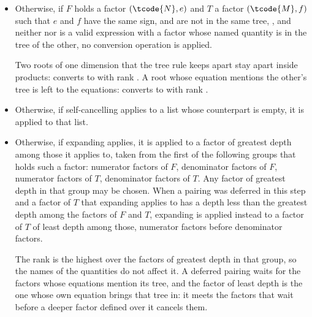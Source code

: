 \begin{itemize}
for which  is a valid expression with a factor
whose named quantity, recursively, has such an equation.
\begin{note}
The sideways relation between two siblings is decided once every factor of their tree is present.
The named quantity of a factor that defers a pairing has an equation and therefore a defining ancestor,
so expanding applies to that factor;
a deferred pairing is applied once it is no longer deferred.
\end{note}
\item
Otherwise, if $F$ holds a factor $(\tcode{N}, e)$ and $T$ a factor $(\tcode{M}, f)$ such that
$e$ and $f$ have the same sign,  and  are not in the same tree,
, and neither  nor
 is a valid expression with a factor whose named quantity is
in the tree of the other, no conversion operation is applied.
\begin{note}
Two roots of one dimension that the tree rule keeps apart stay apart inside products:
 converts to  with rank .
A root whose equation mentions the other's tree is left to the equations:
 converts to  with rank .
\end{note}
\item
Otherwise, if self-cancelling applies to a list whose counterpart is empty,
it is applied to that list.
\item
Otherwise, if expanding applies,
it is applied to a factor of greatest depth among those it applies to,
taken from the first of the following groups that holds such a factor:
numerator factors of $F$, denominator factors of $F$,
numerator factors of $T$, denominator factors of $T$.
Any factor of greatest depth in that group may be chosen.
When a pairing was deferred in this step and a factor of $T$ that expanding applies to
has a depth less than the greatest depth among the factors of $F$ and $T$,
expanding is applied instead to a factor of $T$ of least depth among those,
numerator factors before denominator factors.
\begin{note}
The rank is the highest over the factors of greatest depth in that group,
so the names of the quantities do not affect it.
A deferred pairing waits for the factors whose equations mention its tree,
and the factor of least depth is the one whose own equation brings that tree in:
it meets the factors that wait before a deeper factor defined over it cancels them.
\end{note}
\end{itemize}

